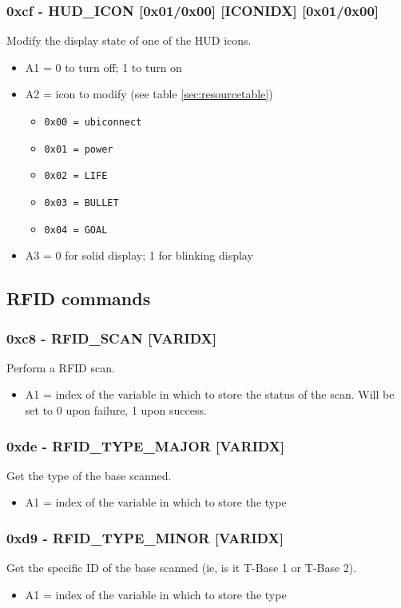 \documentclass[12pt,a4paper]{scrbook}
\begin{document}
\subsubsection{0xcf - HUD\_ICON [0x01/0x00] [ICONIDX] [0x01/0x00]}
Modify the display state of one of the HUD icons. 
\begin{itemize}
\item A1 = 0 to turn off; 1 to turn on
\item A2 = icon to modify (see table \ref{sec:resourcetable})
\begin{itemize}
\item \texttt{0x00 = ubiconnect}
\item \texttt{0x01 = power}
\item \texttt{0x02 = LIFE}
\item \texttt{0x03 = BULLET}
\item \texttt{0x04 = GOAL}
\end{itemize}
\item A3 = 0 for solid display; 1 for blinking display
\end{itemize}


\subsection{RFID commands}

\subsubsection{0xc8 - RFID\_SCAN [VARIDX]}
Perform a RFID scan.
\begin{itemize}
\item A1 = index of the variable in which to store the status of the scan.  Will be set to 0 
		upon failure, 1 upon success.
\end{itemize}

\subsubsection{0xde - RFID\_TYPE\_MAJOR [VARIDX]}
Get the type of the base scanned.
\begin{itemize}
\item A1 = index of the variable in which to store the type
\end{itemize}

\subsubsection{0xd9 - RFID\_TYPE\_MINOR [VARIDX]}
Get the specific ID of the base scanned (ie, is it T-Base 1 or T-Base 2).
\begin{itemize}
\item A1 = index of the variable in which to store the type
\end{itemize}
\end{document}
